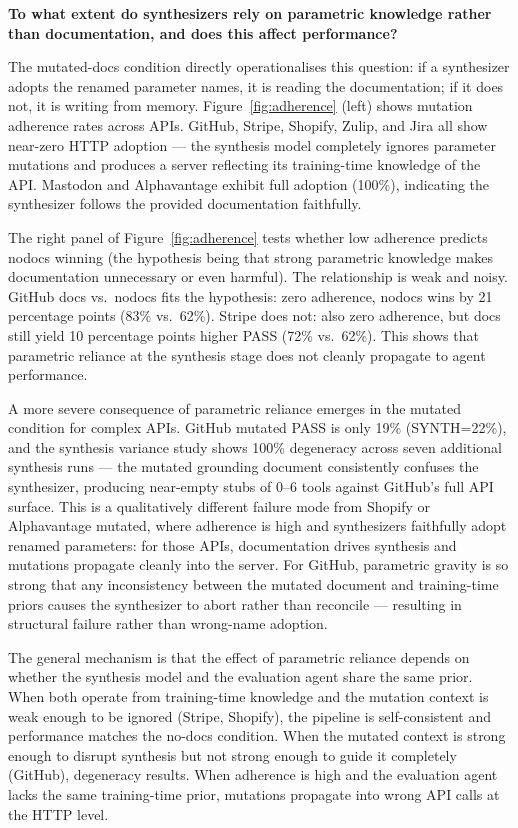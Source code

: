 \documentclass[12pt]{report}
\begin{document}
\textbf{To what extent do synthesizers rely on parametric knowledge rather
than documentation, and does this affect performance?}

The mutated-docs condition directly operationalises this question: if a
synthesizer adopts the renamed parameter names, it is reading the
documentation; if it does not, it is writing from memory.
Figure~\ref{fig:adherence} (left) shows mutation adherence rates across
APIs. GitHub, Stripe, Shopify, Zulip, and Jira all show near-zero HTTP
adoption --- the synthesis model completely ignores parameter mutations and
produces a server reflecting its training-time knowledge of the API.
Mastodon and Alphavantage exhibit full adoption (100\%), indicating the
synthesizer follows the provided documentation faithfully.

The right panel of Figure~\ref{fig:adherence} tests whether low adherence
predicts nodocs winning (the hypothesis being that strong parametric
knowledge makes documentation unnecessary or even harmful). The relationship
is weak and noisy. GitHub docs vs.\ nodocs fits the hypothesis: zero
adherence, nodocs wins by 21 percentage points (83\% vs.\ 62\%).
Stripe does not: also zero adherence, but docs still yield 10 percentage
points higher PASS (72\% vs.\ 62\%). This shows that parametric reliance at
the synthesis stage does not cleanly propagate to agent performance.

A more severe consequence of parametric reliance emerges in the mutated
condition for complex APIs. GitHub mutated PASS is only 19\% (SYNTH=22\%),
and the synthesis variance study shows 100\% degeneracy across seven
additional synthesis runs --- the mutated grounding document consistently
confuses the synthesizer, producing near-empty stubs of 0--6 tools against
GitHub's full API surface. This is a qualitatively different failure mode
from Shopify or Alphavantage mutated, where adherence is high and
synthesizers faithfully adopt renamed parameters: for those APIs,
documentation drives synthesis and mutations propagate cleanly into the
server. For GitHub, parametric gravity is so strong that any inconsistency
between the mutated document and training-time priors causes the synthesizer
to abort rather than reconcile --- resulting in structural failure rather than
wrong-name adoption.

The general mechanism is that the effect of parametric reliance depends on
whether the synthesis model and the evaluation agent share the same prior.
When both operate from training-time knowledge and the mutation context is
weak enough to be ignored (Stripe, Shopify), the pipeline is self-consistent
and performance matches the no-docs condition. When the mutated context is
strong enough to disrupt synthesis but not strong enough to guide it
completely (GitHub), degeneracy results. When adherence is high and the
evaluation agent lacks the same training-time prior, mutations propagate into
wrong API calls at the HTTP level.
\end{document}
